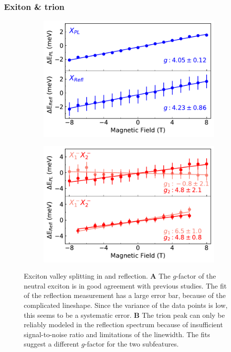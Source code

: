 \subsubsection{Exiton \& trion}

\begin{figure}[t]
	\begin{subfigure}{0.49\textwidth}
		\caption{}
		\includegraphics[width=\textwidth]{G_X}
	\end{subfigure}
	\begin{subfigure}{0.49\textwidth}
		\caption{}
		\includegraphics[width=\textwidth]{G_T}
	\end{subfigure}
	\caption{Exciton valley splitting in \pl and reflection. \textbf{A} The $g$-factor of the neutral exciton is in good agreement with previous studies. The fit of the reflection measurement has a large error bar, because of the complicated lineshape. Since the variance of the data points is low, this seems to be a systematic error. \textbf{B} The trion peak can only be reliably modeled in the reflection spectrum because of insufficient signal-to-noise ratio and limitations of the linewidth. The fits suggest a different $g$-factor for the two subfeatures.}
	\label{Xfits}
\end{figure}

